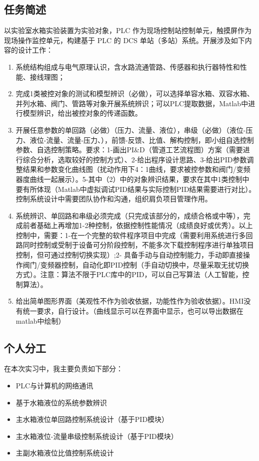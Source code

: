\documentclass[UTF8]{article}
\begin{document}
\subsection{任务简述}
以实验室水箱实验装置为实验对象，PLC 作为现场控制站控制单元，触摸屏作为现场操作监控单元，构建基于 PLC 的 DCS 单站（多站）系统。开展涉及如下内容的设计工作：
\begin{enumerate}
	\item 系统结构组成与电气原理认识，含水路流通管路、传感器和执行器特性和性能、接线理图；
	\item 完成1类被控对象的测试和模型辨识（必做），可以选择单容水箱、双容水箱、并列水箱、阀门、管路等对象开展系统辨识；可以PLC提取数据，Matlab中进行模型辨识，给出被控对象的传递函数。
	\item 开展任意参数的单回路（必做）（压力、流量、液位），串级（必做）（液位-压力、液位-流量、流量-压力、），前馈-反馈、比值、解构控制，即小组自选控制参数、自选控制策略。要求：1-画出PI\&D（管道工艺流程图）方案（需要进行综合分析，选取较好的控制方式）、2-给出程序设计思路、3-给出PID参数调整结果和参数变化曲线图（扰动作用下4：1曲线，要求被控参数和阀门/变频器度曲线一起展示）。5-其中（2）中的对象辨识结果，要求在其中1类控制中要有所体现（Matlab中虚拟调试PID结果与实际控制PID结果需要进行对比）。控制系统设计中需要团队协作和沟通，组织肩负项目管理作用。
	\item 系统辨识、单回路和串级必须完成（只完成该部分的，成绩合格或中等），完成前者基础上再增加1-2种控制，依据控制性能情况（成绩良好或优秀）。以上控制中，需要：1-在一个完整的软件程序项目中完成（需要利用系统进行多回路同时控制或受制于设备可分阶段控制，不能多次下载控制程序进行单独项目控制，但可通过控制切换实现）;2- 具备手动与自动控制能力，手动即直接操作阀门/变频器控制，自动化即PID控制（手自动切换中，尽量采取无扰切换方式）。注意：算法不限于PLC库中的PID，可以自己写算法（人工智能，控制算法）。
	\item 给出简单图形界面（美观性不作为验收依据，功能性作为验收依据）。HMI没有统一要求，自行设计。（曲线显示可以在界面中显示，也可以导出数据在matlab中绘制）
\end{enumerate}

\subsection{个人分工}
在本次实习中，我主要负责如下部分：
\begin{itemize}
    \item PLC与计算机的网络通讯
	\item 基于水箱液位的系统参数辨识
	\item 主水箱液位单回路控制系统设计（基于PID模块）
	\item 主水箱液位-流量串级控制系统设计（基于PID模块）
	\item 主副水箱液位比值控制系统设计
\end{itemize}
\end{document}
